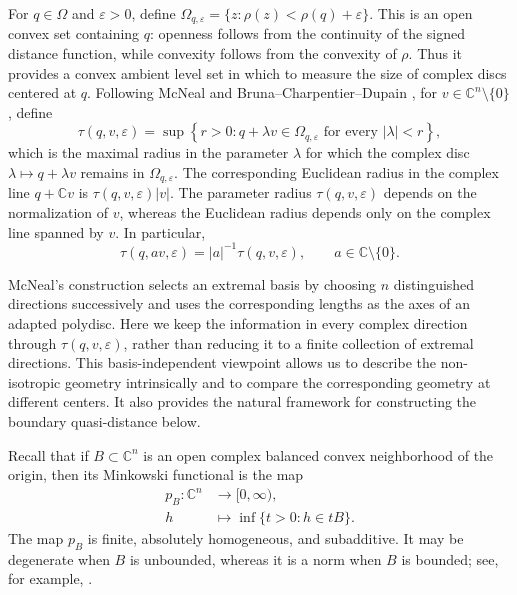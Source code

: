 \documentclass[11pt]{article}
\theoremstyle{definition}
\newcommand{\C}{\mathbb{C}}
\newcommand{\eps}{\varepsilon}
\begin{document}
For \(q\in\Omega\) and \(\eps>0\), define
\(\Omega_{q,\eps}=\{z:\rho(z)<\rho(q)+\eps\}\).
This is an open convex set containing \(q\): openness follows from the
continuity of the signed distance function, while convexity follows from the
convexity of \(\rho\).  Thus it provides a convex ambient level set in which
to measure the size of complex discs centered at \(q\).
Following McNeal \cite{McNealBergman} and Bruna--Charpentier--Dupain
\cite{BrunaCharpentierDupain}, for \(v\in\C^n\setminus\{0\}\), define
\begin{equation*}
	\tau(q,v,\eps)
	=
	\sup\left\{
	r>0:
	q+\lambda v\in\Omega_{q,\eps}
	\text{ for every }|\lambda|<r
	\right\},
\end{equation*}
which is the maximal radius in the parameter
\(\lambda\) for which the complex disc
\(\lambda\mapsto q+\lambda v\) remains in \(\Omega_{q,\eps}\).
The corresponding Euclidean radius in the complex line \(q+\C v\) is
\(\tau(q,v,\eps)|v|\).  The parameter radius \(\tau(q,v,\eps)\) depends
on the normalization of \(v\), whereas the Euclidean radius depends only
on the complex line spanned by \(v\).  In particular,
\begin{equation}\label{eq:tau-homogeneity}
 \tau(q,av,\eps)=|a|^{-1}\tau(q,v,\eps),\qquad a\in\C\setminus\{0\}.
\end{equation}

McNeal's construction selects an extremal basis by choosing \(n\)
distinguished directions successively and uses the corresponding lengths as
the axes of an adapted polydisc.  Here we keep the information in every
complex direction through \(\tau(q,v,\eps)\), rather than reducing it to a
finite collection of extremal directions.  This basis-independent viewpoint
allows us to describe the non-isotropic geometry intrinsically and to compare
the corresponding geometry at different centers.  It also provides the
natural framework for constructing the boundary quasi-distance below.


Recall that if \(B\subset\C^n\) is an open complex balanced convex neighborhood of the origin, then its Minkowski functional is the map
\[
\begin{aligned}
p_B:\C^n&\longrightarrow[0,\infty),\\
h&\longmapsto\inf\{t>0:h\in tB\}.
\end{aligned}
\]
The map \(p_B\) is finite, absolutely homogeneous, and subadditive. It may be degenerate when \(B\) is unbounded, whereas it is a norm when \(B\) is bounded; see, for example, \cite[Chapter~1]{RudinFA}.
\end{document}
